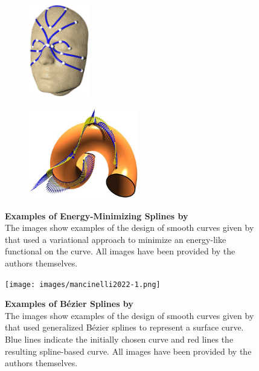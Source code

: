 \documentclass{stdlocal}
\begin{document}
\begin{figure}[b]
  \centering
  \begin{subfigure}[b]{0.39\linewidth}
    \centering
    \includegraphics[height=4cm]{images/hofer2004-1.png}
  \end{subfigure}
  \begin{subfigure}[b]{0.59\linewidth}
    \centering
    \includegraphics[height=4cm]{images/hofer2004-2.png}
  \end{subfigure}
  \caption[Examples of Energy-Minimizing Splines by \textcite{hofer2004}]{%
    \textbf{Examples of Energy-Minimizing Splines by \textcite{hofer2004}}\\
    The images show examples of the design of smooth curves given by \textcite{hofer2004} that used a variational approach to minimize an energy-like functional on the curve.
    All images have been provided by the authors themselves.
  }
  \label{fig:hofer2004}
\end{figure}

\begin{figure}[t]
  \centering
  \texttt{[image: images/mancinelli2022-1.png]}
  \caption[Examples of Bézier Splines by \textcite{mancinelli2022}]{%
    \textbf{Examples of Bézier Splines by \textcite{mancinelli2022}}\\
    The images show examples of the design of smooth curves given by \textcite{mancinelli2022} that used generalized Bézier splines to represent a surface curve.
    Blue lines indicate the initially chosen curve and red lines the resulting spline-based curve.
    All images have been provided by the authors themselves.
  }
  \label{fig:mancinelli2022}
\end{figure}
\end{document}
